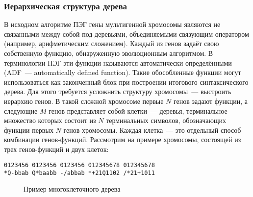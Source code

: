 
\subsubsection{Иерархическая структура дерева}

В исходном алгоритме ПЭГ гены мультигенной хромосомы являются не связанными между собой под-деревьями, объединяемыми связующим оператором (например, арифметическим сложением). Каждый из генов задаёт свою собственную функцию, обнаруженную эволюционным алгоритмом. В терминологии ПЭГ эти функции называются автоматически определёнными (ADF~--- automatically defined function). Такие обособленные функции могут использоваться как законченный блок при построении итогового синтаксического дерева. Для этого требуется усложнить структуру хромосомы~--- выстроить иерархию генов. В такой сложной хромосоме первые $N$ генов задают функции, а следующие $M$ генов представляет собой клетки~--- деревья, терминальное множество которых состоит из $N$ терминальных символов, обозначающих функции первых $N$ генов хромосомы. Каждая клетка~--- это отдельный способ комбинации генов-функций.
Рассмотрим на примере хромосомы, состоящей из трех генов-функций и двух клеток:

\begin{samepage}
\begin{verbatim}
0123456 0123456 0123456 012345678 012345678
*Q-bbab Q*baabb -/abbab *+21Q1102 /*21+1011
\end{verbatim}
\end{samepage}

\begin{figure} [h]
  \center
  \caption{Пример многоклеточного дерева}
  \label{img:GEP_ADF_sample}
\end{figure}

